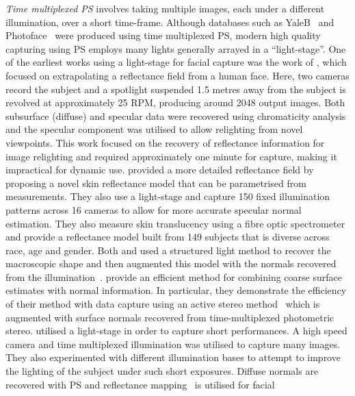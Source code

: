 \textit{Time multiplexed PS} involves taking multiple images, each under
a different illumination, over a short time-frame. Although databases such as
YaleB~\cite{georghiades2001fromfew} and Photoface~\cite{zafeiriou2013photoface} were produced
using time multiplexed PS, modern high quality capturing using PS employs
many lights generally arrayed in a ``light-stage''. One of the earliest works
using a light-stage for facial capture was the work of
\citet{debevec2000acquiring}, which focused on extrapolating a reflectance
field from a human face. Here, two cameras record the subject and a spotlight
suspended 1.5 metres away from the subject is revolved at approximately 25 RPM,
producing around 2048 output images. Both subsurface (diffuse) and specular data
were recovered using chromaticity analysis and the specular component was
utilised to allow relighting from novel viewpoints. This work focused on the
recovery of reflectance information for image relighting and required
approximately one minute for capture, making it impractical for dynamic use.
\citet{weyrich2006analysis} provided a more
detailed reflectance field by proposing a novel skin reflectance model
that can be parametrised from measurements. They also use a light-stage and
capture 150 fixed illumination patterns across 16 cameras to allow for more
accurate specular normal estimation. They also measure skin translucency
using a fibre optic spectrometer~\cite{nickell2000anisotropy} and provide
a reflectance model built from 149 subjects that is diverse across race, age and
gender. Both \citet{weyrich2006analysis} and \citet{debevec2000acquiring} used
a structured light method to recover
the macroscopic shape and then augmented this model with the normals
recovered from the illumination~\cite{nehab2005efficiently}.
\cite{nehab2005efficiently} provide an efficient method for combining coarse
surface estimates with normal information. In particular, they demonstrate the
efficiency of their method with data capture using an
active stereo method~\cite{zhang2003spacetime,davis2005spacetime} which is
augmented with surface normals recovered from time-multiplexed photometric
stereo.
\citet{wenger2005performance} utilised a light-stage in order to capture
short performances. A high speed camera and time multiplexed illumination was
utilised to capture many images. They also experimented with different
illumination bases to attempt to improve the lighting of the subject
under such short exposures. Diffuse normals are recovered with PS and
reflectance mapping~\cite{miller1984illumination} is utilised for facial
